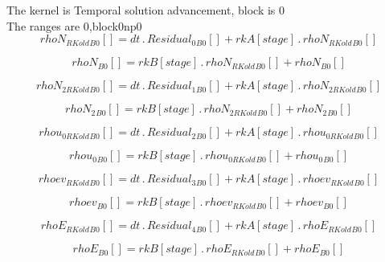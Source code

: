 \documentclass{article}
\begin{document}
\noindent The kernel is Temporal solution advancement, block is 0\\\noindent The ranges are 0,block0np0\\\begin{dmath}{rhoN_{RKold}{_{B0}}}[{}] = dt \,.\, {Residual_{0}{_{B0}}}[{}] + {rkA}[{stage}] \,.\, {rhoN_{RKold}{_{B0}}}[{}]\end{dmath}

\begin{dmath}{rhoN{_{B0}}}[{}] = {rkB}[{stage}] \,.\, {rhoN_{RKold}{_{B0}}}[{}] + {rhoN{_{B0}}}[{}]\end{dmath}

\begin{dmath}{rhoN_{2 RKold}{_{B0}}}[{}] = dt \,.\, {Residual_{1}{_{B0}}}[{}] + {rkA}[{stage}] \,.\, {rhoN_{2 RKold}{_{B0}}}[{}]\end{dmath}

\begin{dmath}{rhoN_{2}{_{B0}}}[{}] = {rkB}[{stage}] \,.\, {rhoN_{2 RKold}{_{B0}}}[{}] + {rhoN_{2}{_{B0}}}[{}]\end{dmath}

\begin{dmath}{rhou_{0 RKold}{_{B0}}}[{}] = dt \,.\, {Residual_{2}{_{B0}}}[{}] + {rkA}[{stage}] \,.\, {rhou_{0 RKold}{_{B0}}}[{}]\end{dmath}

\begin{dmath}{rhou_{0}{_{B0}}}[{}] = {rkB}[{stage}] \,.\, {rhou_{0 RKold}{_{B0}}}[{}] + {rhou_{0}{_{B0}}}[{}]\end{dmath}

\begin{dmath}{rhoev_{RKold}{_{B0}}}[{}] = dt \,.\, {Residual_{3}{_{B0}}}[{}] + {rkA}[{stage}] \,.\, {rhoev_{RKold}{_{B0}}}[{}]\end{dmath}

\begin{dmath}{rhoev{_{B0}}}[{}] = {rkB}[{stage}] \,.\, {rhoev_{RKold}{_{B0}}}[{}] + {rhoev{_{B0}}}[{}]\end{dmath}

\begin{dmath}{rhoE_{RKold}{_{B0}}}[{}] = dt \,.\, {Residual_{4}{_{B0}}}[{}] + {rkA}[{stage}] \,.\, {rhoE_{RKold}{_{B0}}}[{}]\end{dmath}

\begin{dmath}{rhoE{_{B0}}}[{}] = {rkB}[{stage}] \,.\, {rhoE_{RKold}{_{B0}}}[{}] + {rhoE{_{B0}}}[{}]\end{dmath}
\end{document}
